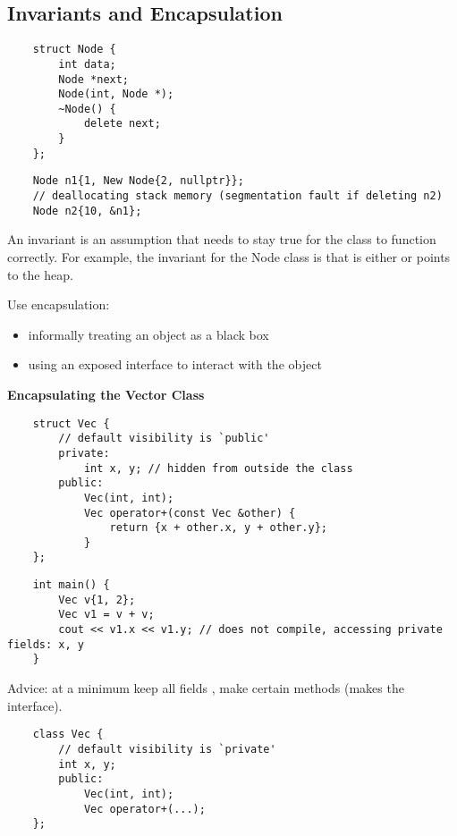 \subsection{Invariants and Encapsulation}
\begin{lstlisting}
    struct Node {
        int data;
        Node *next;
        Node(int, Node *);
        ~Node() {
            delete next;
        }
    };
\end{lstlisting}
\begin{lstlisting}
    Node n1{1, New Node{2, nullptr}};
    // deallocating stack memory (segmentation fault if deleting n2)
    Node n2{10, &n1};
\end{lstlisting}

An invariant is an assumption that needs to stay true for the class to function
correctly. For example, the invariant for the Node class is that 
is either  or points to the heap.

Use encapsulation:
\begin{itemize}
    \item informally treating an object as a black box
    \item using an exposed interface to interact with the object
\end{itemize}

\textbf{Encapsulating the Vector Class}

\begin{lstlisting}
    struct Vec {
        // default visibility is `public'
        private: 
            int x, y; // hidden from outside the class
        public:
            Vec(int, int);
            Vec operator+(const Vec &other) {
                return {x + other.x, y + other.y};
            }
    };
\end{lstlisting}
\begin{lstlisting}
    int main() {
        Vec v{1, 2};
        Vec v1 = v + v;
        cout << v1.x << v1.y; // does not compile, accessing private fields: x, y
    }
\end{lstlisting}

Advice: at a minimum keep all fields , make certain methods 
(makes the interface).

\begin{lstlisting}
    class Vec {
        // default visibility is `private'
        int x, y;
        public:
            Vec(int, int);
            Vec operator+(...);
    };
\end{lstlisting}
